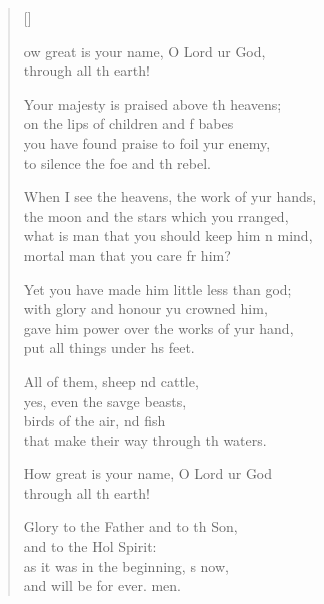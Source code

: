 \settowidth{\versewidth}{When I see the heavens, the work of your hand,}
\begin{verse}[\versewidth]
  \begin{patverse}

ow great is your name, O Lord ur God,\Med\\
through all th earth!

Your majesty is praised above th heavens;\Med\\
on the lips of children and f babes\\
you have found praise to foil yur enemy,\Med\\
to silence the foe and th rebel.

When I see the heavens, the work of yur hands,\Med\\
the moon and the stars which you rranged,\\
what is man that you should keep him \pointup{\i}n mind,\Med\\
mortal man that you care fr him?

Yet you have made him little less than  god;\Med\\
with glory and honour yu crowned him,\\
gave him power over the works of yur hand,\Med\\
put all things under h\pointup{\i}s feet.

All of them, sheep nd cattle,\Med\\
yes, even the savge beasts,\\
birds of the air, nd fish\Med\\
that make their way through th waters.

How great is your name, O Lord ur God\Med\\
through all th earth!

Glory to the Father and to th Son,\Med\\
and to the Hol Spirit:\\
as it was in the beginning, \pointup{\i}s now,\Med\\
and will be for ever. men.
  \end{patverse}
  \end{verse}
